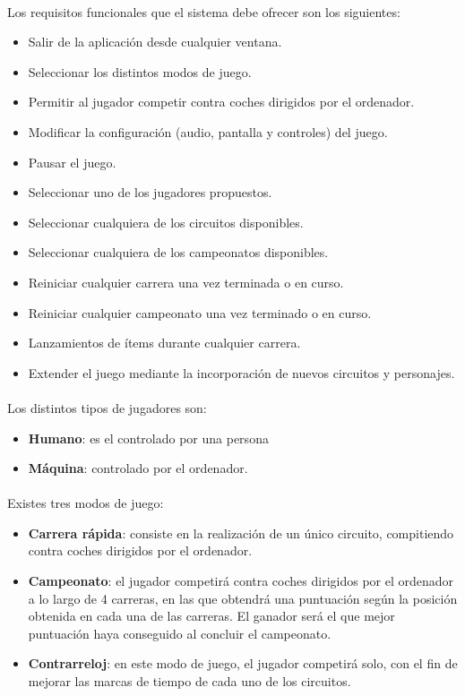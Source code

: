 \paragraph{}
Los requisitos funcionales que el sistema debe ofrecer son los siguientes:

\begin{itemize}
    \item Salir de la aplicación desde cualquier ventana.
    \item Seleccionar los distintos modos de juego.
    \item Permitir al jugador competir contra coches dirigidos por el ordenador.
    \item Modificar la configuración (audio, pantalla y controles) del juego.
    \item Pausar el juego.
    \item Seleccionar uno de los jugadores propuestos.
    \item Seleccionar cualquiera de los circuitos disponibles.
    \item Seleccionar cualquiera de los campeonatos disponibles.
    \item Reiniciar cualquier carrera una vez terminada o en curso.
    \item Reiniciar cualquier campeonato una vez terminado o en curso.
    \item Lanzamientos de ítems durante cualquier carrera.
    \item Extender el juego mediante la incorporación de nuevos circuitos y personajes.
\end{itemize}

\paragraph{}
Los distintos tipos de jugadores son:

\begin{itemize}
    \item \textbf{Humano}: es el controlado por una persona
    \item \textbf{Máquina}: controlado por el ordenador.
\end{itemize}

\paragraph{}
Existes tres modos de juego:

\begin{itemize}
	\item \textbf{Carrera rápida}: consiste en la realización de un único circuito, compitiendo contra coches dirigidos 
    por el ordenador.
	\item \textbf{Campeonato}: el jugador competirá contra coches dirigidos por el ordenador a lo largo de 4 carreras, 
    en las que obtendrá una puntuación
	según la posición obtenida en cada una de las carreras. El ganador será el que mejor puntuación haya conseguido al concluir
	el campeonato.
	\item \textbf{Contrarreloj}: en este modo de juego, el jugador competirá solo, con el fin de mejorar las marcas de tiempo de cada uno de los 
	circuitos.
\end{itemize}



